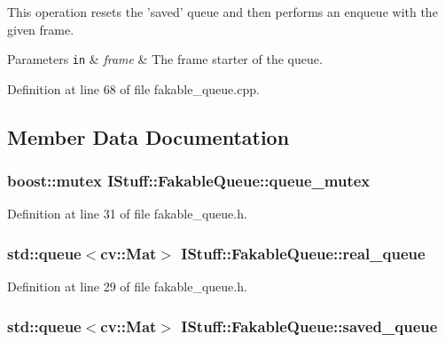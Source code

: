 This operation resets the 'saved' queue and then performs an enqueue with the given frame.


\begin{DoxyParams}[1]{Parameters}
\mbox{\tt in}  & {\em frame} & The frame starter of the queue. \\
\hline
\end{DoxyParams}


Definition at line 68 of file fakable\-\_\-queue.\-cpp.



\subsection{Member Data Documentation}
\hypertarget{class_i_stuff_1_1_fakable_queue_a463ced47c344cac9858ddb9c3a2a5fc6}{
\subsubsection[{queue\-\_\-mutex}]{\setlength{\rightskip}{0pt plus 5cm}boost\-::mutex I\-Stuff\-::\-Fakable\-Queue\-::queue\-\_\-mutex\hspace{0.3cm}{\ttfamily [private]}}}\label{class_i_stuff_1_1_fakable_queue_a463ced47c344cac9858ddb9c3a2a5fc6}


Definition at line 31 of file fakable\-\_\-queue.\-h.

\hypertarget{class_i_stuff_1_1_fakable_queue_a572a03879f073d8fa1babbfbf4b9d573}{
\subsubsection[{real\-\_\-queue}]{\setlength{\rightskip}{0pt plus 5cm}std\-::queue$<$cv\-::\-Mat$>$ I\-Stuff\-::\-Fakable\-Queue\-::real\-\_\-queue\hspace{0.3cm}{\ttfamily [private]}}}\label{class_i_stuff_1_1_fakable_queue_a572a03879f073d8fa1babbfbf4b9d573}


Definition at line 29 of file fakable\-\_\-queue.\-h.

\hypertarget{class_i_stuff_1_1_fakable_queue_a4204d286617b6b3e9c1732946e06d0ad}{
\subsubsection[{saved\-\_\-queue}]{\setlength{\rightskip}{0pt plus 5cm}std\-::queue$<$cv\-::\-Mat$>$ I\-Stuff\-::\-Fakable\-Queue\-::saved\-\_\-queue\hspace{0.3cm}{\ttfamily [private]}}}\label{class_i_stuff_1_1_fakable_queue_a4204d286617b6b3e9c1732946e06d0ad}


